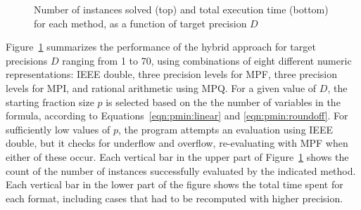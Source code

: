 \documentclass[
hf
]{ceurart}
\begin{document}
\begin{figure}[t]
\caption{Number of instances solved (top) and total execution time (bottom) for each method, as a function of target precision $D$}
\label{fig:solution:effort}
\end{figure}

Figure~\ref{fig:solution:effort}
summarizes the performance of the hybrid approach for target precisions
$D$ ranging from 1 to 70, using combinations of eight different numeric representations: IEEE
double, three precision levels for MPF, three precision levels for
MPI, and rational arithmetic using MPQ\@.  For a given value of $D$, the starting fraction
size $p$ is selected based on the the number
of variables in the formula, according to Equations~\ref{eqn:pmin:linear} and \ref{eqn:pmin:roundoff}.  For sufficiently low values of $p$, the
program attempts an evaluation using IEEE double, but it checks for
underflow and overflow, re-evaluating with MPF when either of these occur.
Each vertical bar in the upper part of Figure~\ref{fig:solution:effort} shows
the count of the number of instances successfully evaluated by the
indicated method.  Each vertical bar in the lower part of
the figure shows the total time spent for each
format, including cases that had to be recomputed with higher
precision.
\end{document}
